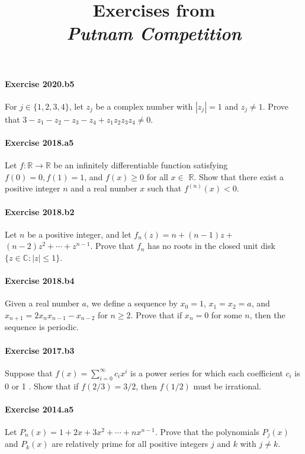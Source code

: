 \documentclass{article}
\title{\textbf{
Exercises from \\
\textit{Putnam Competition} \\
}}
\date{}
\begin{document}
\maketitle


\paragraph{Exercise 2020.b5} For $j \in\{1,2,3,4\}$, let $z_{j}$ be a complex number with $\left|z_{j}\right|=1$ and $z_{j} \neq 1$. Prove that $3-z_{1}-z_{2}-z_{3}-z_{4}+z_{1} z_{2} z_{3} z_{4} \neq 0 .$


\paragraph{Exercise 2018.a5} Let $f: \mathbb{R} \rightarrow \mathbb{R}$ be an infinitely differentiable function satisfying $f(0)=0, f(1)=1$, and $f(x) \geq 0$ for all $x \in$ $\mathbb{R}$. Show that there exist a positive integer $n$ and a real number $x$ such that $f^{(n)}(x)<0$.


\paragraph{Exercise 2018.b2} Let $n$ be a positive integer, and let $f_{n}(z)=n+(n-1) z+$ $(n-2) z^{2}+\cdots+z^{n-1}$. Prove that $f_{n}$ has no roots in the closed unit disk $\{z \in \mathbb{C}:|z| \leq 1\}$.


\paragraph{Exercise 2018.b4} Given a real number $a$, we define a sequence by $x_{0}=1$, $x_{1}=x_{2}=a$, and $x_{n+1}=2 x_{n} x_{n-1}-x_{n-2}$ for $n \geq 2$. Prove that if $x_{n}=0$ for some $n$, then the sequence is periodic.


\paragraph{Exercise 2017.b3} Suppose that $f(x)=\sum_{i=0}^{\infty} c_{i} x^{i}$ is a power series for which each coefficient $c_{i}$ is 0 or 1 . Show that if $f(2 / 3)=3 / 2$, then $f(1 / 2)$ must be irrational.


\paragraph{Exercise 2014.a5} Let
$P_n(x)=1+2 x+3 x^2+\cdots+n x^{n-1} .$ Prove that the polynomials $P_j(x)$ and $P_k(x)$ are relatively prime for all positive integers $j$ and $k$ with $j \neq k$.
\end{document}
